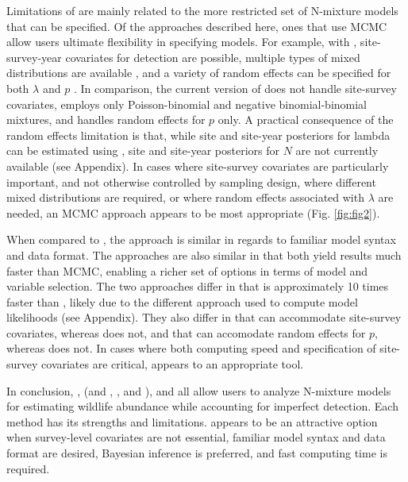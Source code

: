 \documentclass[codesnippet]{jss}
\begin{document}
Limitations of  are mainly related to the more restricted set of N-mixture models that can be specified. Of the approaches described here, ones that use MCMC allow users ultimate flexibility in specifying models. For example, with , site-survey-year covariates for detection are possible, multiple types of mixed distributions are available \citep{Joseph_Elkin_Martin_Possingham_2009,Martin_Royle_Mackenzie_Edwards_Kery_Gardner_2011}, and a variety of random effects can be specified for both $\lambda$ and $p$ \citep{Kery_Schaub_2011}. In comparison, the current version of  does not handle site-survey covariates, employs only Poisson-binomial and negative binomial-binomial mixtures, and handles random effects for $p$ only. A practical consequence of the random effects limitation is that, while site and site-year posteriors for lambda can be estimated using , site and site-year posteriors for $N$ are not currently available (see Appendix). In cases where site-survey covariates are particularly important, and not otherwise controlled by sampling design, where different mixed distributions are required, or where random effects associated with $\lambda$ are needed, an MCMC approach appears to be most appropriate (Fig. \ref{fig:fig2}).

When compared to , the  approach is similar in regards to familiar model syntax and data format. The approaches are also similar in that both yield results much faster than MCMC, enabling a richer set of options in terms of model and variable selection. The two approaches differ in that  is approximately 10 times faster than , likely due to the different approach used to compute model likelihoods (see Appendix). They also differ in that  can accommodate site-survey covariates, whereas  does not, and that  can accomodate random effects for $p$, whereas  does not. In cases where both computing speed and specification of site-survey covariates are critical,  appears to an appropriate tool.

In conclusion, ,  (and , , and ), and  all allow users to analyze N-mixture models for estimating wildlife abundance while accounting for imperfect detection. Each method has its strengths and limitations.  appears to be an attractive option when survey-level covariates are not essential, familiar model syntax and data format are desired, Bayesian inference is preferred, and fast computing time is required.
\end{document}
